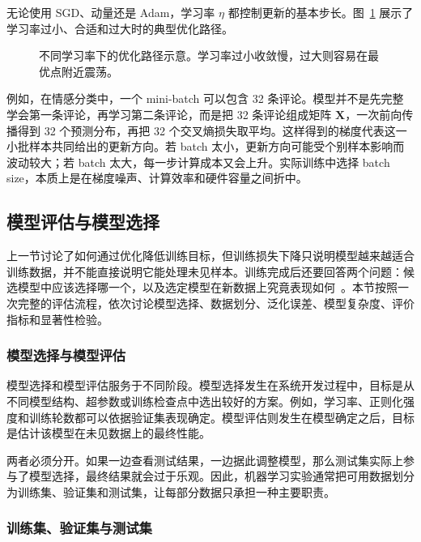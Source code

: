 无论使用 SGD、动量还是 Adam，学习率 $\eta$ 都控制更新的基本步长。图~\ref{fig:nlpbook-learning-rate-comparison} 展示了学习率过小、合适和过大时的典型优化路径。


\begin{figure}[htbp]
  \centering
  
  \caption{不同学习率下的优化路径示意。学习率过小收敛慢，过大则容易在最优点附近震荡。}
  \label{fig:nlpbook-learning-rate-comparison}
\end{figure}

例如，在情感分类中，一个 mini-batch 可以包含 32 条评论。模型并不是先完整学会第一条评论，再学习第二条评论，而是把 32 条评论组成矩阵 $\mathbf{X}$，一次前向传播得到 32 个预测分布，再把 32 个交叉熵损失取平均。这样得到的梯度代表这一小批样本共同给出的更新方向。若 batch 太小，更新方向可能受个别样本影响而波动较大；若 batch 太大，每一步计算成本又会上升。实际训练中选择 batch size，本质上是在梯度噪声、计算效率和硬件容量之间折中。

\subsection{模型评估与模型选择}

上一节讨论了如何通过优化降低训练目标，但训练损失下降只说明模型越来越适合训练数据，并不能直接说明它能处理未见样本。训练完成后还要回答两个问题：候选模型中应该选择哪一个，以及选定模型在新数据上究竟表现如何~\cite{Hastie-etal:2009}。本节按照一次完整的评估流程，依次讨论模型选择、数据划分、泛化误差、模型复杂度、评价指标和显著性检验。

\subsubsection{模型选择与模型评估}

模型选择和模型评估服务于不同阶段。模型选择发生在系统开发过程中，目标是从不同模型结构、超参数或训练检查点中选出较好的方案。例如，学习率、正则化强度和训练轮数都可以依据验证集表现确定。模型评估则发生在模型确定之后，目标是估计该模型在未见数据上的最终性能。

两者必须分开。如果一边查看测试结果，一边据此调整模型，那么测试集实际上参与了模型选择，最终结果就会过于乐观。因此，机器学习实验通常把可用数据划分为训练集、验证集和测试集，让每部分数据只承担一种主要职责。

\subsubsection{训练集、验证集与测试集}


